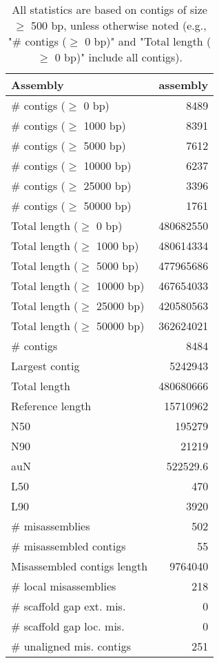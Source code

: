 \documentclass[12pt,a4paper]{article}
\begin{document}
\begin{table}[ht]
\begin{center}
\caption{All statistics are based on contigs of size $\geq$ 500 bp, unless otherwise noted (e.g., "\# contigs ($\geq$ 0 bp)" and "Total length ($\geq$ 0 bp)" include all contigs).}
\begin{tabular}{|l*{1}{|r}|}
\hline
Assembly & assembly \\ \hline
\# contigs ($\geq$ 0 bp) & 8489 \\ \hline
\# contigs ($\geq$ 1000 bp) & 8391 \\ \hline
\# contigs ($\geq$ 5000 bp) & 7612 \\ \hline
\# contigs ($\geq$ 10000 bp) & 6237 \\ \hline
\# contigs ($\geq$ 25000 bp) & 3396 \\ \hline
\# contigs ($\geq$ 50000 bp) & 1761 \\ \hline
Total length ($\geq$ 0 bp) & 480682550 \\ \hline
Total length ($\geq$ 1000 bp) & 480614334 \\ \hline
Total length ($\geq$ 5000 bp) & 477965686 \\ \hline
Total length ($\geq$ 10000 bp) & 467654033 \\ \hline
Total length ($\geq$ 25000 bp) & 420580563 \\ \hline
Total length ($\geq$ 50000 bp) & 362624021 \\ \hline
\# contigs & 8484 \\ \hline
Largest contig & 5242943 \\ \hline
Total length & 480680666 \\ \hline
Reference length & 15710962 \\ \hline
N50 & 195279 \\ \hline
N90 & 21219 \\ \hline
auN & 522529.6 \\ \hline
L50 & 470 \\ \hline
L90 & 3920 \\ \hline
\# misassemblies & 502 \\ \hline
\# misassembled contigs & 55 \\ \hline
Misassembled contigs length & 9764040 \\ \hline
\# local misassemblies & 218 \\ \hline
\# scaffold gap ext. mis. & 0 \\ \hline
\# scaffold gap loc. mis. & 0 \\ \hline
\# unaligned mis. contigs & 251 \\ \hline

\end{tabular}
\end{center}
\end{table}
\end{document}
